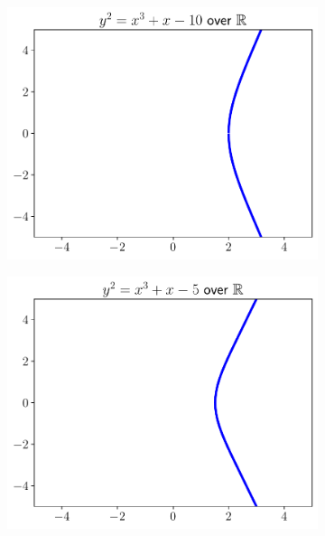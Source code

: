 \begin{figure}[p]
\centering
    \begin{subfigure}[t]{0.45\textwidth}
    \includegraphics[width=\textwidth]{plots/ec_reals/ec_reals_1_n10.pdf}
    \end{subfigure}
    \begin{subfigure}[t]{0.45\textwidth}
    \includegraphics[width=\textwidth]{plots/ec_reals/ec_reals_1_n5.pdf}
    \end{subfigure}


\end{figure}
